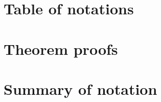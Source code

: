 \documentclass[a4paper,onecolumn,11pt, unpublished]{quantumarticle}
\theoremstyle{definition}
\theoremstyle{definition}
\begin{document}


\section{Table of notations}\label{app:notation}


\section{Theorem proofs}\label{app:proofs}


% 

\section*{Summary of notation}

\end{document}

